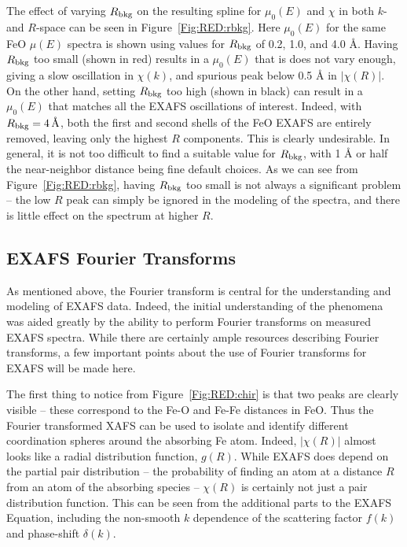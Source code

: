 The effect of varying $R_{\rm bkg}$ on the resulting spline for $\mu_0(E)$
and $\chi$ in both $k$- and $R$-space can be seen in
Figure~\ref{Fig:RED:rbkg}.  Here $\mu_0(E)$ for the same FeO $\mu(E)$
spectra is shown using values for $R_{\rm bkg}$ of 0.2, 1.0, and 4.0 {\AA}.
Having $R_{\rm bkg}$ too small (shown in red) results in a $\mu_0(E)$ that
is does not vary enough, giving a slow oscillation in $\chi(k)$, and
spurious peak below 0.5 {\AA} in $|\chi(R)|$.  On the other hand, setting
$R_{\rm bkg}$ too high (shown in black) can result in a $\mu_0(E)$ that
matches all the EXAFS oscillations of interest.  Indeed, with $R_{\rm bkg}
= 4\, \text{\AA}$, both the first and second shells of the FeO EXAFS are
entirely removed, leaving only the highest $R$ components.  This is clearly
undesirable.  In general, it is not too difficult to find a suitable value
for $R_{\rm bkg}$, with 1 {\AA} or half the near-neighbor distance being
fine default choices.  As we can see from Figure~\ref{Fig:RED:rbkg}, having
$R_{\rm bkg}$ too small is not always a significant problem -- the low $R$
peak can simply be ignored in the modeling of the spectra, and there is
little effect on the spectrum at higher $R$.

\subsection{EXAFS Fourier Transforms}

As mentioned above, the Fourier transform is central for the understanding
and modeling of EXAFS data.  Indeed, the initial understanding of the
phenomena was aided greatly by the ability to perform Fourier transforms on
measured EXAFS spectra.  While there are certainly ample resources
describing Fourier transforms, a few important points about the use of
Fourier transforms for EXAFS will be made here.

The first thing to notice from Figure~\ref{Fig:RED:chir} is that two peaks are
clearly visible -- these correspond to the Fe-O and Fe-Fe distances in
FeO.  Thus the Fourier transformed XAFS can be used to isolate and identify
different coordination spheres around the absorbing Fe atom.  Indeed,
$|\chi(R)|$ almost looks like a radial distribution function, $g(R)$.
While EXAFS does depend on the partial pair distribution -- the probability
of finding an atom at a distance $R$ from an atom of the absorbing species
-- $\chi(R)$ is certainly not just a pair distribution function.  This can
be seen from the additional parts to the EXAFS Equation, including the
non-smooth $k$ dependence of the scattering factor $f(k)$ and phase-shift
$\delta(k)$.

